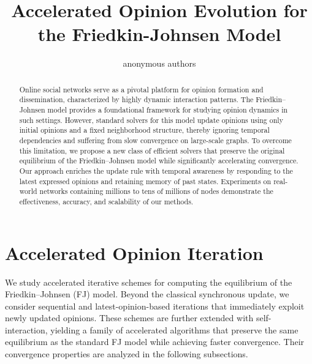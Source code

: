 \documentclass[sigconf,review, nonacm]{acmart}
\begin{document}
\title{Accelerated Opinion Evolution for the Friedkin-Johnsen Model}

\author{anonymous authors}

\begin{abstract}
Online social networks serve as a pivotal platform for opinion formation and dissemination, characterized by highly dynamic interaction patterns. The Friedkin–Johnsen model provides a foundational framework for studying opinion dynamics in such settings. However, standard solvers for this model update opinions using only initial opinions and a fixed neighborhood structure, thereby ignoring temporal dependencies and suffering from slow convergence on large-scale graphs. To overcome this limitation, we propose a new class of efficient solvers that preserve the original equilibrium of the Friedkin–Johnsen model while significantly accelerating convergence. Our approach enriches the update rule with temporal awareness by responding to the latest expressed opinions and retaining memory of past states.
Experiments on real-world networks containing millions to tens of millions of nodes demonstrate the effectiveness, accuracy, and scalability of our methods.

\end{abstract}




\maketitle









\section{Accelerated Opinion Iteration}
We study accelerated iterative schemes for computing the equilibrium of the Friedkin--Johnsen (FJ) model.
Beyond the classical synchronous update, we consider sequential and latest-opinion-based iterations that immediately exploit newly updated opinions.
These schemes are further extended with self-interaction, yielding a family of accelerated algorithms that preserve the same equilibrium as the standard FJ model while achieving faster convergence.
Their convergence properties are analyzed in the following subsections.
\end{document}
